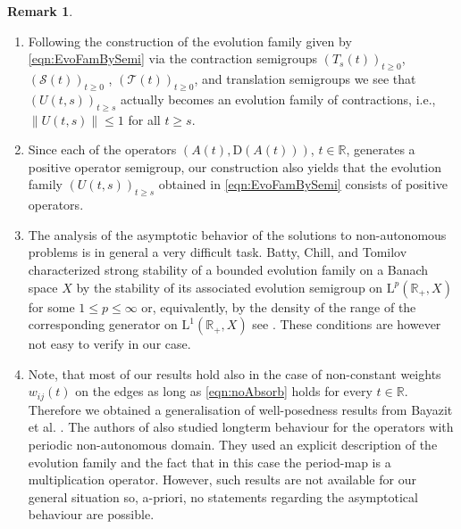 \documentclass[a4paper,oneside,10pt]{amsart}
\theoremstyle{definition}
\newtheorem{remark}[theorem]{Remark}
\numberwithin{equation}{section}
\newenvironment{abc}{\begin{enumerate}[{\rm (a)}]}{\end{enumerate}}
\def\dom{\mathrm{D}}
\def\RR{\mathbb{R}}
\begin{document}
\begin{remark}
\begin{abc}
	\item Following the construction of the evolution family given by \eqref{eqn:EvoFamBySemi} via the contraction semigroups $(T_s(t))_{t\geq0}$, $(\mathcal{S}(t))_{t\geq0}$ , $(\mathcal{T}(t))_{t\geq0}$, and translation semigroups we see that $(U(t,s))_{t\geq s}$ actually becomes an evolution family of contractions, i.e., $\left\|U(t,s)\right\|\leq1$ for all $t\geq s$. 
	\item Since each of the operators $(A(t),\dom(A(t)))$, $t\in\RR$,  generates a positive operator semigroup, our construction also yields that  the evolution family $(U(t,s))_{t\geq s}$ obtained in \eqref{eqn:EvoFamBySemi}  consists of positive operators.
 \item  The analysis of the asymptotic behavior of the solutions to non-autonomous problems is in general a very difficult task. 
Batty, Chill, and Tomilov characterized strong stability of a bounded evolution family on a Banach space $X$ by the stability of its associated evolution semigroup on $\mathrm{L}^p( \RR_+,X)$ for some $1 \le p\le \infty$ or, equivalently, by the density of the range of the corresponding  generator on $\mathrm{L}^1( \RR_+,X)$ see  \cite[Thm.~2.2]{BCT2002}. These conditions are however not easy to verify in our case. 

\item Note, that most of our results hold also in the case of non-constant  weights  $w_{ij}(t)$ on the edges as long as  \eqref{eqn:noAbsorb} holds for every $t\in\RR$. Therefore we obtained a generalisation of well-posedness results from Bayazit et al. \cite{BDF2013}. The authors of \cite{BDF2013} also studied longterm  behaviour for the operators with periodic non-autonomous domain. They used an explicit description of the evolution family and the fact that in this case the period-map is a multiplication operator. 
However, such results are not available for our general situation so, a-priori, no statements regarding the asymptotical behaviour are possible.

\end{abc}
\end{remark}
\end{document}
